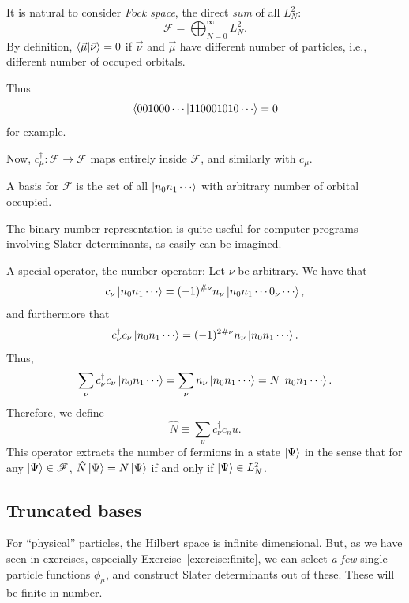 \documentclass{report}
\theoremstyle{plain}
\theoremstyle{definition}
\begin{document}
It is natural to consider \emph{Fock space}, the direct \emph{sum} of
all $L^2_N$:
\begin{equation}
  \mathscr{F} = \bigoplus_{N=0}^\infty L^2_N.
\end{equation}
By definition, $\braket{\vec{\mu}|\vec{\nu}} = 0$ if $\vec{\nu}$ and
$\vec{\mu}$ have different number of particles, i.e., different number
of occuped orbitals.

Thus
\begin{equation}
  \braket{001000\cdots|110001010\cdots} = 0
\end{equation}
for example.

Now, $c^\dag_\mu : \mathscr{F} \to \mathscr{F}$ maps entirely inside
$\mathscr{F}$, and similarly with $c_\mu$.

A basis for $\mathscr{F}$ is the set of all $\ket{n_0 n_1 \cdots}$
with arbitrary number of orbital occupied.

The binary number representation is quite useful for computer programs
involving Slater determinants, as easily can be imagined.


A special operator, the number operator:
Let $\nu$ be arbitrary. We have that
\begin{equation}
  c_\nu \ket{n_0 n_1 \cdots} = (-1)^{\#\nu} n_\nu \ket{n_0 n_1 \cdots
    0_\nu \cdots},
\end{equation}
and furthermore that
\begin{equation}
  c^\dag_\nu c_\nu \ket{n_0 n_1 \cdots} = (-1)^{2\#\nu} n_\nu \ket{n_0 n_1 \cdots}.
\end{equation}
Thus,
\begin{equation}
  \sum_{\nu} c^\dag_\nu c_\nu \ket{n_0 n_1 \cdots} = \sum_{\nu} n_\nu
  \ket{n_0 n_1\cdots} = N \ket{n_0 n_1 \cdots}.
\end{equation}
Therefore, we define
\begin{equation}
  \hat{N} \equiv \sum_\nu c^\dag_\nu c_nu.
\end{equation}
This operator extracts the number of fermions in a state $\ket{\Psi}$
in the sense that for any $\ket{\Psi} \in \mathscr{F}$, $\hat{N}\ket{\Psi} =
N\ket{\Psi}$ if and only if $\ket{\Psi} \in L^2_N$. 

\subsection{Truncated bases}

For ``physical'' particles, the Hilbert space is infinite
dimensional. But, as we have seen in exercises, especially
Exercise~\ref{exercise:finite}, we can select \emph{a few}
single-particle functions $\phi_\mu$, and construct Slater
determinants out of these. These will be finite in number.
\end{document}
